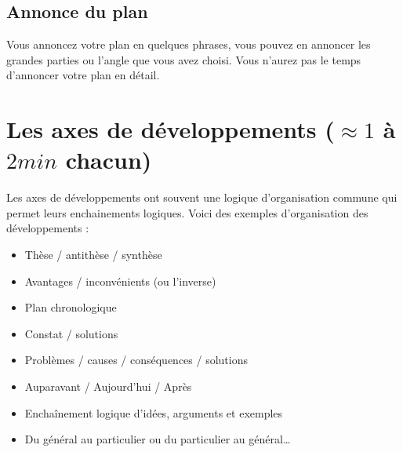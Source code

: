\subsection*{Annonce du plan}
Vous annoncez votre plan en quelques phrases, vous pouvez en annoncer les grandes parties ou l’angle que vous avez choisi. Vous n’aurez pas le temps d’annoncer votre plan en détail.

\newpage

\section{Les axes de développements ($\approx 1$ à $2min$ chacun)}
Les axes de développements ont souvent une logique d'organisation commune qui permet leurs enchainements logiques.
Voici des exemples d'organisation des développements :
\begin{itemize}
    \item Thèse / antithèse / synthèse
    \item Avantages / inconvénients (ou l’inverse)
    \item Plan chronologique
    \item Constat / solutions
    \item Problèmes / causes / conséquences / solutions
    \item Auparavant / Aujourd’hui / Après
    \item Enchaînement logique d’idées, arguments et exemples
    \item Du général au particulier ou du particulier au général…
\end{itemize}

